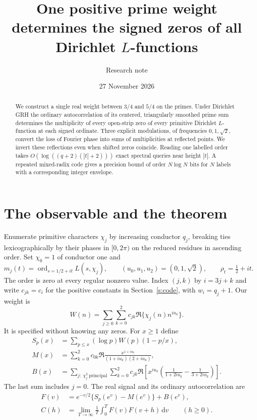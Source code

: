 \documentclass[11pt]{article}
\title{One positive prime weight determines the signed zeros of all Dirichlet $L$-functions}
\author{Research note}
\date{27 November 2026}
\newcommand{\dd}{\,\mathrm d}
\DeclareMathOperator{\ord}{ord}
\begin{document}
\maketitle
\begin{abstract}
We construct a single real weight between $3/4$ and $5/4$ on the primes. Under Dirichlet GRH the ordinary autocorrelation of its centered, triangularly smoothed prime sum determines the multiplicity of every open-strip zero of every primitive Dirichlet $L$-function at each signed ordinate. Three explicit modulations, of frequencies $0,1,\sqrt2$, convert the loss of Fourier phase into sums of multiplicities at reflected points. We invert these reflections even when shifted zeros coincide. Reading one labelled order takes $O(\log((q+2)(|t|+2)))$ exact spectral queries near height $|t|$. A repeated mixed-radix code gives a precision bound of order $N\log N$ bits for $N$ labels with a corresponding integer envelope.
\end{abstract}

\section{The observable and the theorem}

Enumerate primitive characters $\chi_j$ by increasing conductor $q_j$, breaking ties lexicographically by their phases in $[0,2\pi)$ on the reduced residues in ascending order. Set $\chi_0=1$ of conductor one and
\[
 m_j(t)=\ord_{s=1/2+it} L(s,\chi_j),\qquad
 (u_0,u_1,u_2)=(0,1,\sqrt2),\qquad \rho_t=\tfrac12+it.
\]
The order is zero at every regular nonzero value. Index $(j,k)$ by $i=3j+k$ and write $c_{jk}=c_i$ for the positive constants in Section~\ref{s:code}, with $w_i=q_j+1$. Our weight is
\[
 W(n)=\sum_{j\ge0}\sum_{k=0}^2 c_{jk}\Re\{\chi_j(n)n^{iu_k}\}.
\]
It is specified without knowing any zeros. For $x\ge1$ define
\begin{align*}
 S_p(x)&=\sum_{p\le x}(\log p) W(p)(1-p/x),\\
 M(x)&=\sum_{k=0}^2 c_{0k}\Re\frac{x^{1+iu_k}}{(1+iu_k)(2+iu_k)},\\
 B(x)&=\sum_{j:\ \chi_j^2\ \mathrm{principal}}\sum_{k=0}^2
 c_{jk}\Re\!\left[x^{iu_k}\!\left(\frac1{1+2iu_k}-\frac1{3+2iu_k}\right)\right].
\end{align*}
The last sum includes $j=0$. The real signal and its ordinary autocorrelation are
\begin{align}
 F(v)&=e^{-v/2}\{S_p(e^v)-M(e^v)\}+B(e^v),\nonumber\\
 C(h)&=\lim_{T\to\infty}\frac1T\int_0^TF(v)F(v+h)\dd v\qquad(h\ge0).\label{eq:obs}
\end{align}
\end{document}
